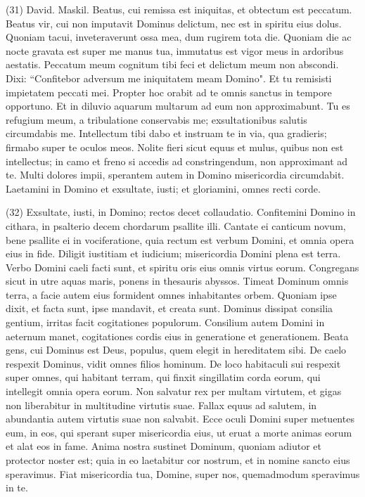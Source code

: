 \begin{biblechapter}  (31) 
\verse  David. Maskil. Beatus, cui remissa est iniquitas, et obtectum est peccatum. 
\verse Beatus vir, cui non imputavit Dominus delictum, nec est in spiritu eius dolus. 
\verse Quoniam tacui, inveteraverunt ossa mea, dum rugirem tota die. 
\verse Quoniam die ac nocte gravata est super me manus tua, immutatus est vigor meus in ardoribus aestatis. 
\verse Peccatum meum cognitum tibi feci et delictum meum non abscondi. Dixi: “Confitebor adversum me iniquitatem meam Domino". Et tu remisisti impietatem peccati mei. 
\verse Propter hoc orabit ad te omnis sanctus in tempore opportuno. Et in diluvio aquarum multarum ad eum non approximabunt. 
\verse Tu es refugium meum, a tribulatione conservabis me; exsultationibus salutis circumdabis me. 
\verse Intellectum tibi dabo et instruam te in via, qua gradieris; firmabo super te oculos meos. 
\verse Nolite fieri sicut equus et mulus, quibus non est intellectus; in camo et freno si accedis ad constringendum, non approximant ad te. 
\verse Multi dolores impii, sperantem autem in Domino misericordia circumdabit. 
\verse Laetamini in Domino et exsultate, iusti; et gloriamini, omnes recti corde. 
\end{biblechapter}

\begin{biblechapter}  (32) 
\verse Exsultate, iusti, in Domino; rectos decet collaudatio. 
\verse Confitemini Domino in cithara, in psalterio decem chordarum psallite illi. 
\verse Cantate ei canticum novum, bene psallite ei in vociferatione, 
\verse quia rectum est verbum Domini, et omnia opera eius in fide. 
\verse Diligit iustitiam et iudicium; misericordia Domini plena est terra. 
\verse Verbo Domini caeli facti sunt, et spiritu oris eius omnis virtus eorum. 
\verse Congregans sicut in utre aquas maris, ponens in thesauris abyssos. 
\verse Timeat Dominum omnis terra, a facie autem eius formident omnes inhabitantes orbem. 
\verse Quoniam ipse dixit, et facta sunt, ipse mandavit, et creata sunt. 
\verse Dominus dissipat consilia gentium, irritas facit cogitationes populorum. 
\verse Consilium autem Domini in aeternum manet, cogitationes cordis eius in generatione et generationem. 
\verse Beata gens, cui Dominus est Deus, populus, quem elegit in hereditatem sibi. 
\verse De caelo respexit Dominus, vidit omnes filios hominum. 
\verse De loco habitaculi sui respexit super omnes, qui habitant terram, 
\verse qui finxit singillatim corda eorum, qui intellegit omnia opera eorum. 
\verse Non salvatur rex per multam virtutem, et gigas non liberabitur in multitudine virtutis suae. 
\verse Fallax equus ad salutem, in abundantia autem virtutis suae non salvabit. 
\verse Ecce oculi Domini super metuentes eum, in eos, qui sperant super misericordia eius, 
\verse ut eruat a morte animas eorum et alat eos in fame. 
\verse Anima nostra sustinet Dominum, quoniam adiutor et protector noster est; 
\verse quia in eo laetabitur cor nostrum, et in nomine sancto eius speravimus. 
\verse Fiat misericordia tua, Domine, super nos, quemadmodum speravimus in te. 
\end{biblechapter}

